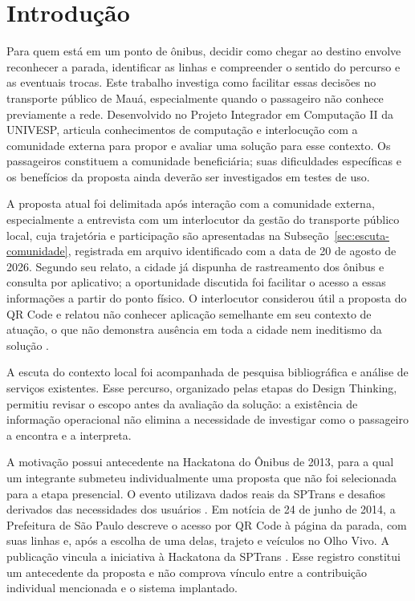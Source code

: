 \documentclass[12pt,oneside,a4paper,brazil]{abntex2}
\begin{document}
\textual
\pagestyle{papnumeracao}
\chapter{Introdução}
Para quem está em um ponto de ônibus, decidir como chegar ao destino envolve reconhecer a parada, identificar as linhas e compreender o sentido do percurso e as eventuais trocas. Este trabalho investiga como facilitar essas decisões no transporte público de Mauá, especialmente quando o passageiro não conhece previamente a rede. Desenvolvido no Projeto Integrador em Computação II da UNIVESP, articula conhecimentos de computação e interlocução com a comunidade externa para propor e avaliar uma solução para esse contexto. Os passageiros constituem a comunidade beneficiária; suas dificuldades específicas e os benefícios da proposta ainda deverão ser investigados em testes de uso.

A proposta atual foi delimitada após interação com a comunidade externa, especialmente a entrevista com um interlocutor da gestão do transporte público local, cuja trajetória e participação são apresentadas na Subseção~\ref{sec:escuta-comunidade}, registrada em arquivo identificado com a data de 20 de agosto de 2026. Segundo seu relato, a cidade já dispunha de rastreamento dos ônibus e consulta por aplicativo; a oportunidade discutida foi facilitar o acesso a essas informações a partir do ponto físico. O interlocutor considerou útil a proposta do QR Code e relatou não conhecer aplicação semelhante em seu contexto de atuação, o que não demonstra ausência em toda a cidade nem ineditismo da solução \citep[181--222 s; 739--853 s]{entrevistaosmar2026}.

A escuta do contexto local foi acompanhada de pesquisa bibliográfica e análise de serviços existentes. Esse percurso, organizado pelas etapas do Design Thinking, permitiu revisar o escopo antes da avaliação da solução: a existência de informação operacional não elimina a necessidade de investigar como o passageiro a encontra e a interpreta.

A motivação possui antecedente na Hackatona do Ônibus de 2013, para a qual um integrante submeteu individualmente uma proposta que não foi selecionada para a etapa presencial. O evento utilizava dados reais da SPTrans e desafios derivados das necessidades dos usuários \citep{hackatona2013}. Em notícia de 24 de junho de 2014, a Prefeitura de São Paulo descreve o acesso por QR Code à página da parada, com suas linhas e, após a escolha de uma delas, trajeto e veículos no Olho Vivo. A publicação vincula a iniciativa à Hackatona da SPTrans \citep{qrsptrans2014}. Esse registro constitui um antecedente da proposta e não comprova vínculo entre a contribuição individual mencionada e o sistema implantado.
\end{document}
